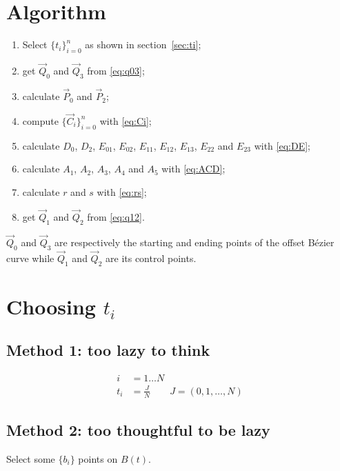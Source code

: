 \documentclass{scrartcl}
\newcommand\V[1]{\vec{#1}}
\begin{document}
\section{Algorithm}

\begin{enumerate}
    \item Select $\{t_i\}_{i=0}^n$ as shown in section~\ref{sec:ti};
    \item get $\V{Q}_0$ and $\V{Q}_3$ from \eqref{eq:q03};
    \item calculate $\V{P}_0$ and $\V{P}_2$;
    \item compute $\{\V{C}_i\}_{i=0}^n$ with \eqref{eq:Ci};
    \item calculate $D_0$, $D_2$, $E_{01}$, $E_{02}$, $E_{11}$,
	$E_{12}$, $E_{13}$, $E_{22}$ and $E_{23}$ with \eqref{eq:DE};
    \item calculate $A_1$, $A_2$, $A_3$, $A_4$ and $A_5$ with
	\eqref{eq:ACD};
    \item calculate $r$ and $s$ with \eqref{eq:rs};
    \item get $\V{Q}_1$ and $\V{Q}_2$ from \eqref{eq:q12}.
\end{enumerate}

$\V{Q}_0$ and $\V{Q}_3$ are respectively the starting and ending
points of the offset Bézier curve while $\V{Q}_1$ and $\V{Q}_2$ are
its control points.

\section{Choosing $t_i$\label{sec:ti}}

\subsection{Method 1: too lazy to think}

\begin{equation*}
\begin{split}
    i &= 1 \dots N\\
    t_i &= \frac{J}{N} \qquad J = (0, 1, \dots, N)
\end{split}
\end{equation*}

\subsection{Method 2: too thoughtful to be lazy}

Select some $\{b_i\}$ points on $B(t)$.
\end{document}
